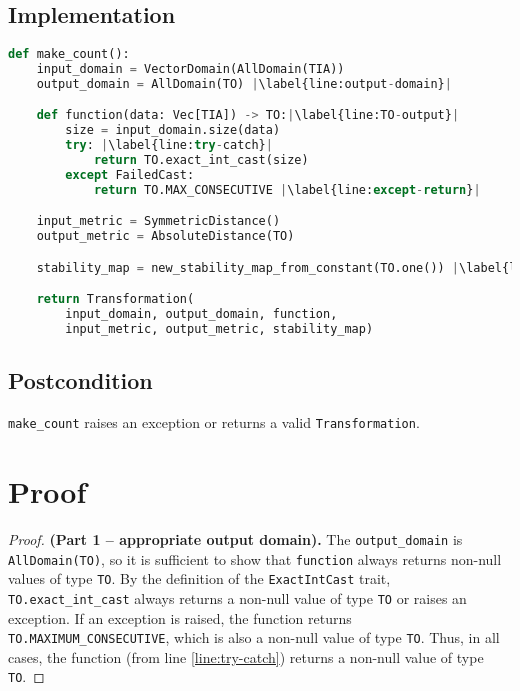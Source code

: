 \documentclass{article}
\begin{document}
\subsection*{Implementation}
\begin{lstlisting}[language = Python, escapechar=|]
def make_count():
    input_domain = VectorDomain(AllDomain(TIA))
    output_domain = AllDomain(TO) |\label{line:output-domain}|

    def function(data: Vec[TIA]) -> TO:|\label{line:TO-output}|
        size = input_domain.size(data)
        try: |\label{line:try-catch}|
            return TO.exact_int_cast(size)
        except FailedCast:
            return TO.MAX_CONSECUTIVE |\label{line:except-return}|

    input_metric = SymmetricDistance()
    output_metric = AbsoluteDistance(TO)

    stability_map = new_stability_map_from_constant(TO.one()) |\label{line:stability-map}|

    return Transformation(
        input_domain, output_domain, function,
        input_metric, output_metric, stability_map)
\end{lstlisting}

\subsection*{Postcondition}
\texttt{make\_count} raises an exception or returns a valid \texttt{Transformation}.

\section{Proof}


\begin{proof} \textbf{(Part 1 -- appropriate output domain).}
    The \texttt{output\_domain} is \texttt{AllDomain(TO)}, so it is sufficient to show that \texttt{function} always returns non-null values of type \texttt{TO}.
    By the definition of the \texttt{ExactIntCast} trait, \texttt{TO.exact\_int\_cast} always returns a non-null value of type \texttt{TO} or raises an exception.
    If an exception is raised, the function returns \texttt{TO.MAXIMUM\_CONSECUTIVE}, which is also a non-null value of type \texttt{TO}.
    Thus, in all cases, the function (from line \ref{line:try-catch}) returns a non-null value of type \texttt{TO}.
\end{proof}
\end{document}
